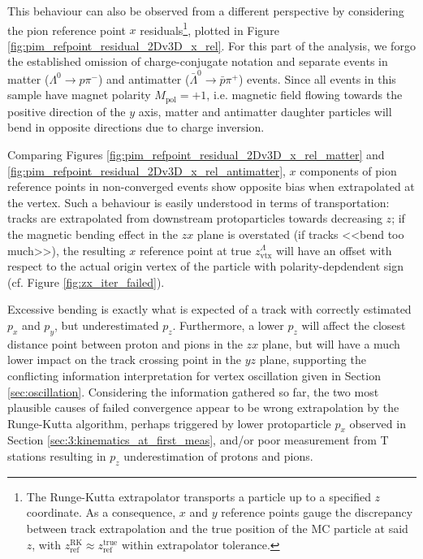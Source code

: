 This behaviour can also be observed from a different perspective by considering the pion reference point $x$ residuals\footnote{The Runge-Kutta extrapolator transports a particle up to a specified $z$ coordinate. As a consequence, $x$ and $y$ reference points gauge the discrepancy between track extrapolation and the true position of the MC particle at said $z$, with $z_\text{ref}^\text{RK} \approx z_\text{ref}^\text{true}$ within extrapolator tolerance.}, plotted in Figure \ref{fig:pim_refpoint_residual_2Dv3D_x_rel}.
For this part of the analysis, we forgo the established omission of charge-conjugate notation and separate events in matter ($\Lambda^0 \rightarrow p\pi^-$) and antimatter ($\bar{\Lambda}^0 \rightarrow \bar{p}\pi^+$) events.
Since all events in this sample have magnet polarity $M_\text{pol} = +1$, i.e. magnetic field flowing towards the positive direction of the $y$ axis,
matter and antimatter daughter particles will bend in opposite directions due to charge inversion.

Comparing Figures \ref{fig:pim_refpoint_residual_2Dv3D_x_rel_matter} and \ref{fig:pim_refpoint_residual_2Dv3D_x_rel_antimatter}, $x$ components of pion reference points in non-converged events show opposite bias when extrapolated at the \lz vertex.
Such a behaviour is easily understood in terms of transportation: tracks are extrapolated from downstream protoparticles towards decreasing $z$;
if the magnetic bending effect in the $zx$ plane is overstated (if tracks <<bend too much>>), the resulting $x$ reference point at true $z_\text{vtx}^\Lambda$ will have an offset with respect to the actual origin vertex of the particle with polarity-depdendent sign (cf. Figure \ref{fig:zx_iter_failed}).

Excessive bending is exactly what is expected of a track with correctly estimated $p_x$ and $p_y$, but underestimated $p_z$.
Furthermore, a lower $p_z$ will affect the closest distance point between proton and pions in the $zx$ plane, but will have a much lower impact on the track crossing point in the $yz$ plane,
supporting the conflicting information interpretation for vertex oscillation given in Section \ref{sec:oscillation}.
Considering the information gathered so far, the two most plausible causes of failed convergence appear to be wrong extrapolation by the Runge-Kutta algorithm, perhaps triggered by lower protoparticle $p_x$ observed in Section \ref{sec:3:kinematics_at_first_meas}, and/or poor measurement from T stations resulting in $p_z$ underestimation of protons and pions.

